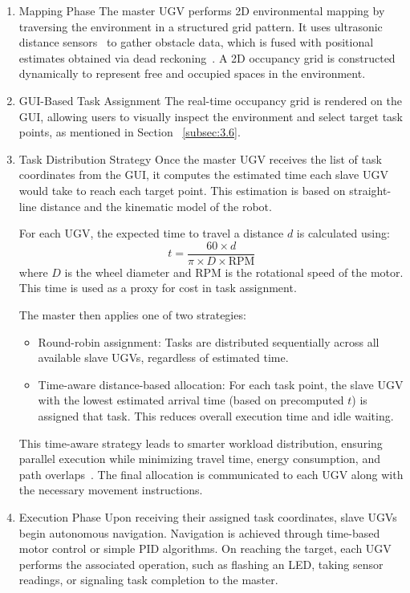 \documentclass[conference]{IEEEtran}
\begin{document}
\begin{enumerate}
\item {Mapping Phase}
The master UGV performs 2D environmental mapping by traversing the environment in a structured grid pattern. It uses ultrasonic distance sensors~\cite{arduino_hcsr04} to gather obstacle data, which is fused with positional estimates obtained via dead reckoning~\cite{kalra2005hoplite}. A 2D occupancy grid is constructed dynamically to represent free and occupied spaces in the environment.

\item {GUI-Based Task Assignment}
The real-time occupancy grid is rendered on the GUI, allowing users to visually inspect the environment and select target task points, as mentioned in Section ~\ref{subsec:3.6}. 

\item {Task Distribution Strategy}
\label{subsec:task_dist}
Once the master UGV receives the list of task coordinates from the GUI, it computes the estimated time each slave UGV would take to reach each target point. This estimation is based on straight-line distance and the kinematic model of the robot.

For each UGV, the expected time to travel a distance $d$ is calculated using:
\begin{equation}
t = \frac{60 \times d}{\pi \times D \times \text{RPM}}
\end{equation}
where $D$ is the wheel diameter and RPM is the rotational speed of the motor. This time is used as a proxy for cost in task assignment.

The master then applies one of two strategies:
\begin{itemize}
    \item {Round-robin assignment:} Tasks are distributed sequentially across all available slave UGVs, regardless of estimated time.
    
    \item {Time-aware distance-based allocation:} For each task point, the slave UGV with the lowest estimated arrival time (based on precomputed $t$) is assigned that task. This reduces overall execution time and idle waiting.
\end{itemize}

This time-aware strategy leads to smarter workload distribution, ensuring parallel execution while minimizing travel time, energy consumption, and path overlaps~\cite{jin2024multi}. The final allocation is communicated to each UGV along with the necessary movement instructions.


\item {Execution Phase}
Upon receiving their assigned task coordinates, slave UGVs begin autonomous navigation. Navigation is achieved through time-based motor control or simple PID algorithms. On reaching the target, each UGV performs the associated operation, such as flashing an LED, taking sensor readings, or signaling task completion to the master.

\end{enumerate}
\end{document}
